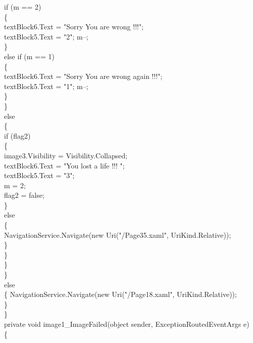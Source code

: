 {{                        if (m == 2)\\
                        \{\\
                            textBlock6.Text = "Sorry You are wrong !!!";\\
                            textBlock5.Text = "2"; m--;\\
                        \}\\
                        else if (m == 1)\\
                        \{\\
                            textBlock6.Text = "Sorry You are wrong again !!!";\\
                            textBlock5.Text = "1"; m--;\\
                        \}\\
                    \}\\
                    else\\
                    \{\\
                        if (flag2)\\
                        \{\\
                            image3.Visibility = Visibility.Collapsed;\\
                            textBlock6.Text = "You lost a life !!! ";\\
                            textBlock5.Text = "3";\\
                            m = 2;\\
                            flag2 = false;\\
                        \}\\
                        else\\
                        \{\\
                            NavigationService.Navigate(new Uri("/Page35.xaml", UriKind.Relative));\\
                        \}\\
                    \}\\
               \}\\
            \}\\
            else\\
            \{
                NavigationService.Navigate(new Uri("/Page18.xaml", UriKind.Relative));\\
            \}\\
        \}\\
        private void image1_ImageFailed(object sender, ExceptionRoutedEventArgs e)\\
        \{

}}
